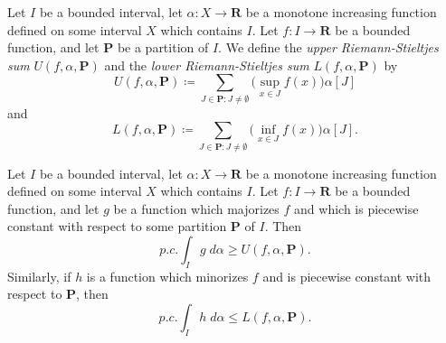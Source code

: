 \begin{additional corollary}\label{ac 11.8.11}
Let \(I\) be a bounded interval, let \(\alpha : X \to \mathbf{R}\) be a monotone increasing function defined on some interval \(X\) which contains \(I\).
Let \(f : I \to \mathbf{R}\) be a bounded function, and let \(\mathbf{P}\) be a partition of \(I\).
We define the \emph{upper Riemann-Stieltjes sum} \(U(f, \alpha, \mathbf{P})\) and the \emph{lower Riemann-Stieltjes sum} \(L(f, \alpha, \mathbf{P})\) by
\[
    U(f, \alpha, \mathbf{P}) \coloneqq \sum_{J \in \mathbf{P} : J \neq \emptyset} \big(\sup_{x \in J} f(x)\big) \alpha[J]
\]
and
\[
    L(f, \alpha, \mathbf{P}) \coloneqq \sum_{J \in \mathbf{P} : J \neq \emptyset} \big(\inf_{x \in J} f(x)\big) \alpha[J].
\]
\end{additional corollary}

\begin{additional corollary}\label{ac 11.8.12}
Let \(I\) be a bounded interval, let \(\alpha : X \to \mathbf{R}\) be a monotone increasing function defined on some interval \(X\) which contains \(I\).
Let \(f : I \to \mathbf{R}\) be a bounded function, and let \(g\) be a function which majorizes \(f\) and which is piecewise constant with respect to some partition \(\mathbf{P}\) of \(I\).
Then
\[
    p.c. \int_I g \; d \alpha \geq U(f, \alpha, \mathbf{P}).
\]
Similarly, if \(h\) is a function which minorizes \(f\) and is piecewise constant with respect to \(\mathbf{P}\), then
\[
    p.c. \int_I h \; d \alpha \leq L(f, \alpha, \mathbf{P}).
\]
\end{additional corollary}

